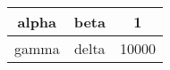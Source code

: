\begin{table}[htp]
\centering
\begin{tabular}{ccc}
alpha 	 & beta 	 & 1 \\ \hline
gamma 	 & delta 	 & 10000 \\ \hline
 \hline
\end{tabular}
\end{table}